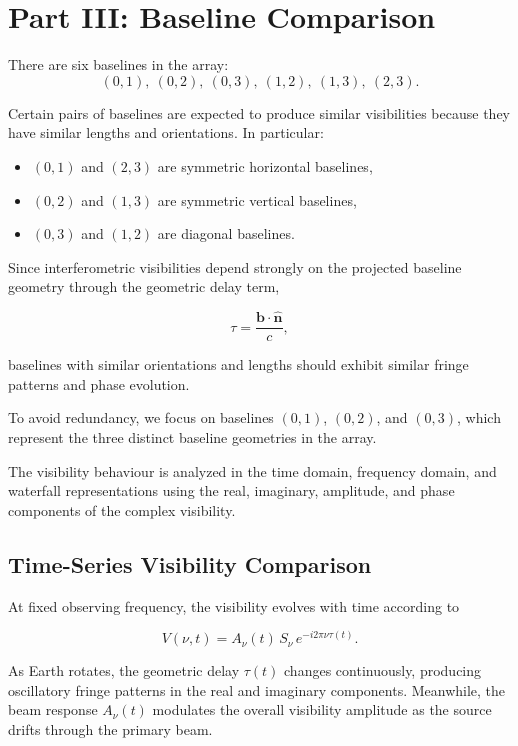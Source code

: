 \documentclass{article}
\begin{document}
\FloatBarrier

\section{Part III: Baseline Comparison}

There are six baselines in the array:
\[
(0,1),\ (0,2),\ (0,3),\ (1,2),\ (1,3),\ (2,3).
\]

Certain pairs of baselines are expected to produce similar visibilities because they have similar lengths and orientations. In particular:

\begin{itemize}
    \item $(0,1)$ and $(2,3)$ are symmetric horizontal baselines,
    \item $(0,2)$ and $(1,3)$ are symmetric vertical baselines,
    \item $(0,3)$ and $(1,2)$ are diagonal baselines.
\end{itemize}

Since interferometric visibilities depend strongly on the projected baseline geometry through the geometric delay term,

\[
\tau = \frac{\mathbf{b}\cdot\hat{\mathbf{n}}}{c},
\]

baselines with similar orientations and lengths should exhibit similar fringe patterns and phase evolution.

To avoid redundancy, we focus on baselines $(0,1)$, $(0,2)$, and $(0,3)$, which represent the three distinct baseline geometries in the array.

The visibility behaviour is analyzed in the time domain, frequency domain, and waterfall representations using the real, imaginary, amplitude, and phase components of the complex visibility.

\subsection{Time-Series Visibility Comparison}

At fixed observing frequency, the visibility evolves with time according to

\[
V(\nu,t) = A_\nu(t)\,S_\nu\,e^{-i2\pi\nu\tau(t)}.
\]

As Earth rotates, the geometric delay $\tau(t)$ changes continuously, producing oscillatory fringe patterns in the real and imaginary components. Meanwhile, the beam response $A_\nu(t)$ modulates the overall visibility amplitude as the source drifts through the primary beam.
\end{document}
